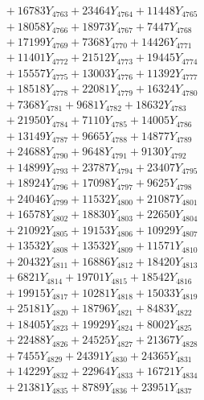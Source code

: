 \documentclass[a4paper,10pt]{article}
\begin{document}
{\begin{align}
&\;  + 16783 Y_{4763} + 23464 Y_{4764} + 11448 Y_{4765} \\[0.3ex]
&\;  + 18058 Y_{4766} + 18973 Y_{4767} + 7447 Y_{4768} \\[0.5ex]\allowbreak
&\;  + 17199 Y_{4769} + 7368 Y_{4770} + 14426 Y_{4771} \\[0.3ex]
&\;  + 11401 Y_{4772} + 21512 Y_{4773} + 19445 Y_{4774} \\[0.3ex]
&\;  + 15557 Y_{4775} + 13003 Y_{4776} + 11392 Y_{4777} \\[0.3ex]
&\;  + 18518 Y_{4778} + 22081 Y_{4779} + 16324 Y_{4780} \\[0.3ex]
&\;  + 7368 Y_{4781} + 9681 Y_{4782} + 18632 Y_{4783} \\[0.3ex]
&\;  + 21950 Y_{4784} + 7110 Y_{4785} + 14005 Y_{4786} \\[0.3ex]
&\;  + 13149 Y_{4787} + 9665 Y_{4788} + 14877 Y_{4789} \\[0.3ex]
&\;  + 24688 Y_{4790} + 9648 Y_{4791} + 9130 Y_{4792} \\[0.3ex]
&\;  + 14899 Y_{4793} + 23787 Y_{4794} + 23407 Y_{4795} \\[0.3ex]
&\;  + 18924 Y_{4796} + 17098 Y_{4797} + 9625 Y_{4798} \\[0.5ex]\allowbreak
&\;  + 24046 Y_{4799} + 11532 Y_{4800} + 21087 Y_{4801} \\[0.3ex]
&\;  + 16578 Y_{4802} + 18830 Y_{4803} + 22650 Y_{4804} \\[0.3ex]
&\;  + 21092 Y_{4805} + 19153 Y_{4806} + 10929 Y_{4807} \\[0.3ex]
&\;  + 13532 Y_{4808} + 13532 Y_{4809} + 11571 Y_{4810} \\[0.3ex]
&\;  + 20432 Y_{4811} + 16886 Y_{4812} + 18420 Y_{4813} \\[0.3ex]
&\;  + 6821 Y_{4814} + 19701 Y_{4815} + 18542 Y_{4816} \\[0.3ex]
&\;  + 19915 Y_{4817} + 10281 Y_{4818} + 15033 Y_{4819} \\[0.3ex]
&\;  + 25181 Y_{4820} + 18796 Y_{4821} + 8483 Y_{4822} \\[0.3ex]
&\;  + 18405 Y_{4823} + 19929 Y_{4824} + 8002 Y_{4825} \\[0.3ex]
&\;  + 22488 Y_{4826} + 24525 Y_{4827} + 21367 Y_{4828} \\[0.5ex]\allowbreak
&\;  + 7455 Y_{4829} + 24391 Y_{4830} + 24365 Y_{4831} \\[0.3ex]
&\;  + 14229 Y_{4832} + 22964 Y_{4833} + 16721 Y_{4834} \\[0.3ex]
&\;  + 21381 Y_{4835} + 8789 Y_{4836} + 23951 Y_{4837} \\[0.3ex]

\end{align}}
\end{document}
